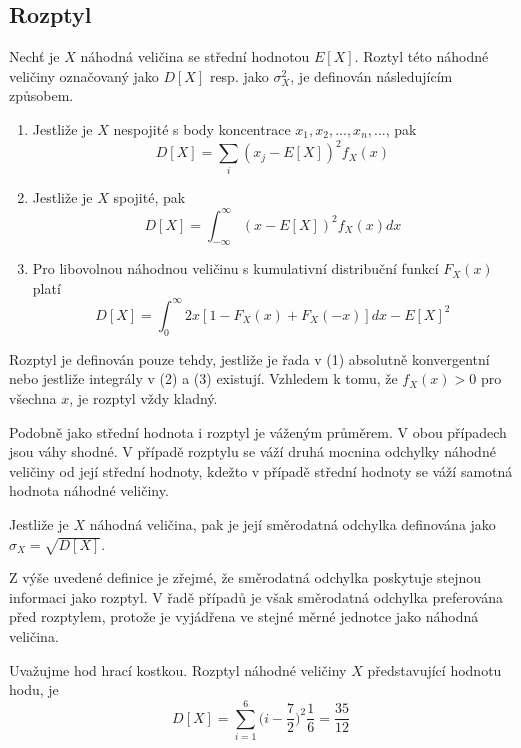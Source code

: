 \subsection{Rozptyl}

\begin{definition}[Rozptyl]
Nechť je $X$ náhodná veličina se střední hodnotou $E[X]$. Roztyl této náhodné veličiny označovaný jako $D[X]$ resp. jako $\sigma_X^2$, je definován následujícím způsobem.
\begin{enumerate}
\item Jestliže je $X$ nespojité s body koncentrace $x_1, x_2, ..., x_n, ...$, pak
\begin{equation*}
D[X] = \sum_i(x_j - E[X])^2 f_X(x)
\end{equation*}
\item Jestliže je $X$ spojité, pak
\begin{equation*}
D[X] = \int_{-\infty}^{\infty}(x - E[X])^2 f_X(x)dx
\end{equation*}
\item Pro libovolnou náhodnou veličinu s kumulativní distribuční funkcí $F_X(x)$ platí
\begin{equation*}
D[X] = \int_0^{\infty} 2x[1 - F_X(x) + F_X(-x)]dx - E[X]^2
\end{equation*}
\end{enumerate}
Rozptyl je definován pouze tehdy, jestliže je řada v (1) absolutně konvergentní nebo jestliže integrály v (2) a (3) existují. Vzhledem k tomu, že $f_X(x) > 0$ pro všechna $x$, je rozptyl vždy kladný.
\end{definition}
Podobně jako střední hodnota i rozptyl je váženým průměrem. V obou případech jsou váhy shodné. V případě rozptylu se váží druhá mocnina odchylky náhodné veličiny od její střední hodnoty, kdežto v případě střední hodnoty se váží samotná hodnota náhodné veličiny.

\begin{definition}
Jestliže je $X$ náhodná veličina, pak je její směrodatná odchylka definována jako $\sigma_X = \sqrt{D[X]}$.
\end{definition}

Z výše uvedené definice je zřejmé, že směrodatná odchylka poskytuje stejnou informaci jako rozptyl. V řadě případů je však směrodatná odchylka preferována před rozptylem, protože je vyjádřena ve stejné měrné jednotce jako náhodná veličina.

\begin{example}
Uvažujme hod hrací kostkou. Rozptyl náhodné veličiny $X$ představující hodnotu hodu, je
\begin{equation*}
D[X] = \sum_{i = 1}^6 \big(i - \frac{7}{2} \big)^2 \frac{1}{6} = \frac{35}{12}
\end{equation*}
\end{example}

